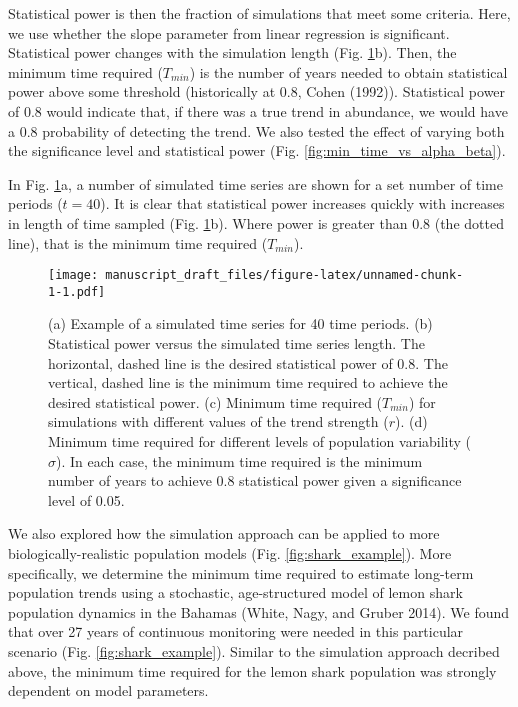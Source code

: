 \documentclass[12pt,]{article}
\begin{document}
Statistical power is then the fraction of simulations that meet some
criteria. Here, we use whether the slope parameter from linear
regression is significant. Statistical power changes with the simulation
length (Fig. \ref{fig:theoretical_approach}b). Then, the minimum time
required (\(T_{min}\)) is the number of years needed to obtain
statistical power above some threshold (historically at 0.8, Cohen
(1992)). Statistical power of 0.8 would indicate that, if there was a
true trend in abundance, we would have a 0.8 probability of detecting
the trend. We also tested the effect of varying both the significance
level and statistical power (Fig. \ref{fig:min_time_vs_alpha_beta}).

In Fig. \ref{fig:theoretical_approach}a, a number of simulated time
series are shown for a set number of time periods (\(t=40\)). It is
clear that statistical power increases quickly with increases in length
of time sampled (Fig. \ref{fig:theoretical_approach}b). Where power is
greater than 0.8 (the dotted line), that is the minimum time required
(\(T_{min}\)).

\begin{figure}[htbp]
\centering
\texttt{[image: manuscript\_draft\_files/figure-latex/unnamed-chunk-1-1.pdf]}
\caption{(a) Example of a simulated time series for 40 time periods. (b)
Statistical power versus the simulated time series length. The
horizontal, dashed line is the desired statistical power of 0.8. The
vertical, dashed line is the minimum time required to achieve the
desired statistical power. (c) Minimum time required (\(T_{min}\)) for
simulations with different values of the trend strength (\(r\)). (d)
Minimum time required for different levels of population variability
(\(\sigma\)). In each case, the minimum time required is the minimum
number of years to achieve 0.8 statistical power given a significance
level of 0.05.\label{fig:theoretical_approach}}
\end{figure}

We also explored how the simulation approach can be applied to more
biologically-realistic population models (Fig. \ref{fig:shark_example}).
More specifically, we determine the minimum time required to estimate
long-term population trends using a stochastic, age-structured model of
lemon shark population dynamics in the Bahamas (White, Nagy, and Gruber
2014). We found that over 27 years of continuous monitoring were needed
in this particular scenario (Fig. \ref{fig:shark_example}). Similar to
the simulation approach decribed above, the minimum time required for
the lemon shark population was strongly dependent on model parameters.
\end{document}
